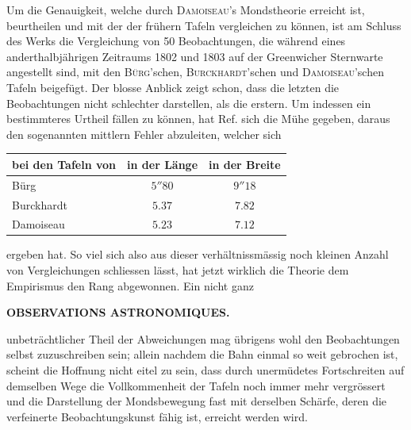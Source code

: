 Um die Genauigkeit, welche durch \textsc{Damoiseau}'s Mondstheorie erreicht ist, beurtheilen und mit der der frühern Tafeln vergleichen zu können, ist am Schluss des Werks die Vergleichung von 50 Beobachtungen, die während eines anderthalbjährigen Zeitraums 1802 und 1803 auf der Greenwicher Sternwarte angestellt sind, mit den \textsc{Bürg}'schen, \textsc{Burckhardt}'schen und \textsc{Damoiseau}'schen Tafeln beigefügt. Der blosse Anblick zeigt schon, dass die letzten die Beobachtungen nicht schlechter darstellen, als die erstern. Um indessen ein bestimmteres Urtheil fällen zu können, hat Ref. sich die Mühe gegeben, daraus den sogenannten mittlern Fehler abzuleiten, welcher sich
\begin{center}
\begin{tabular}{l|c|c}
bei den Tafeln von & in der Länge & in der Breite \\
\hline
Bürg & $5''80$ & $9''18$ \\
Burckhardt & $5.37$ & $7.82$ \\
Damoiseau & $5.23$ & $7.12$ \\
\end{tabular}
\end{center}
\noindent ergeben hat. So viel sich also aus dieser verhältnissmässig noch kleinen Anzahl von
Vergleichungen schliessen lässt, hat jetzt wirklich die Theorie dem Empirismus den Rang
abgewonnen. Ein nicht ganz\par
\clearpage
\thispagestyle{empty}
\noindent{}%
\makebox[12mm][l]{}%
\parbox[t]{\dimexpr\linewidth-24mm\relax}{\centering\scriptsize\bfseries OBSERVATIONS ASTRONOMIQUES.}%
\par\medskip
\noindent unbeträchtlicher Theil der Abweichungen mag übrigens wohl den Beobachtungen selbst zuzuschreiben sein; allein nachdem die Bahn einmal so weit gebrochen ist, scheint die Hoffnung nicht eitel zu sein, dass durch unermüdetes Fortschreiten auf demselben Wege die Vollkommenheit der Tafeln noch immer mehr vergrössert und die Darstellung der Mondsbewegung fast mit derselben Schärfe, deren die verfeinerte Beobachtungskunst fähig ist, erreicht werden wird.
